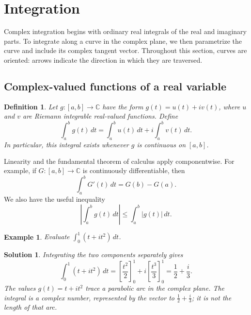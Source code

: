 \documentclass{report}
\newtheorem{definition}{Definition}
\newtheorem{example}{Example}
\newtheorem{solution}{Solution}
\begin{document}

\clearpage
\section{Integration}
\label{sec:integration}

Complex integration begins with ordinary real integrals of the real and
imaginary parts. To integrate along a curve in the complex plane, we then
parametrize the curve and include its complex tangent vector. Throughout
this section, curves are oriented: arrows indicate the direction in which
they are traversed.

\subsection{Complex-valued functions of a real variable}

\begin{definition}
    Let $g:[a,b]\to\mathbb C$ have the form $g(t)=u(t)+iv(t)$, where
    $u$ and $v$ are Riemann integrable real-valued functions. Define
    \[
        \boxed{\displaystyle
        \int_a^b g(t)\,dt
        =\int_a^b u(t)\,dt+i\int_a^b v(t)\,dt.}
    \]
    In particular, this integral exists whenever $g$ is continuous on $[a,b]$.
\end{definition}

Linearity and the fundamental theorem of calculus apply componentwise.
For example, if $G:[a,b]\to\mathbb C$ is continuously differentiable, then
\[
    \int_a^b G'(t)\,dt=G(b)-G(a).
\]
We also have the useful inequality
\[
    \left|\int_a^b g(t)\,dt\right|
    \leq\int_a^b |g(t)|\,dt.
\]

\begin{example}
    Evaluate $\displaystyle\int_0^1(t+it^2)\,dt$.
\end{example}
\begin{solution}
    Integrating the two components separately gives
    \[
        \int_0^1(t+it^2)\,dt
        =\left[\frac{t^2}{2}\right]_0^1
         +i\left[\frac{t^3}{3}\right]_0^1
        =\frac12+\frac{i}{3}.
    \]
    The values $g(t)=t+it^2$ trace a parabolic arc in the complex plane.
    The integral is a complex number, represented by the vector to
    $\frac12+\frac{i}{3}$; it is not the length of that arc.
\end{solution}
\end{document}
